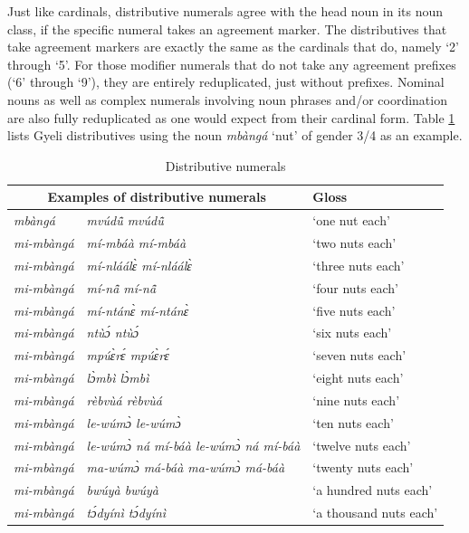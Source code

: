 \noindent Just like cardinals, distributive numerals agree with the head noun in its noun class, if the specific numeral takes an agreement marker. The distributives that take agreement markers are exactly the same as the cardinals that do, namely `2' through `5'. For those modifier numerals that do not take any agreement prefixes (`6' through `9'), they are entirely reduplicated, just without prefixes. Nominal nouns as well as complex numerals involving noun phrases and/or coordination are also fully reduplicated as one would expect from their cardinal form. Table \ref{tab:Distributives} lists Gyeli distributives using the noun {\itshape mbàngá} `nut' of gender 3/4 as an example. 

\begin{table} 
\centering
\begin{tabular}{ll|l}
 \midrule
\multicolumn{2}{c}{Examples of distributive numerals}  & Gloss \\
  \midrule
{\itshape mbàngá} & {\itshape mvúdũ̂ mvúdũ̂} & `one nut each' \\
{\itshape mi-mbàngá} & {\itshape mí-mbáà mí-mbáà} & `two nuts each'\\
{\itshape mi-mbàngá} & {\itshape mí-nláálɛ̀ mí-nláálɛ̀} & `three nuts each' \\
{\itshape mi-mbàngá} & {\itshape mí-nã̂ mí-nã̂} & `four nuts each' \\
{\itshape mi-mbàngá} & {\itshape mí-ntánɛ̀ mí-ntánɛ̀} & `five nuts each' \\
{\itshape mi-mbàngá} & {\itshape ntùɔ́ ntùɔ́} & `six nuts each' \\
{\itshape mi-mbàngá} & {\itshape mpúɛ̀rɛ́ mpúɛ̀rɛ́} & `seven nuts each' \\
{\itshape mi-mbàngá} & {\itshape lɔ̀mbì lɔ̀mbì} & `eight nuts each' \\
{\itshape mi-mbàngá} & {\itshape rèbvùá rèbvùá} & `nine nuts each' \\
{\itshape mi-mbàngá} & {\itshape le-wúmɔ̀ le-wúmɔ̀} & `ten nuts each' \\
{\itshape mi-mbàngá} & {\itshape le-wúmɔ̀ ná mí-báà le-wúmɔ̀ ná mí-báà} & `twelve nuts each' \\
{\itshape mi-mbàngá} & {\itshape ma-wúmɔ̀ má-báà ma-wúmɔ̀ má-báà} & `twenty nuts each' \\
{\itshape mi-mbàngá} & {\itshape bwúyà bwúyà} & `a hundred nuts each' \\
{\itshape mi-mbàngá} & {\itshape tɔ́dyínì tɔ́dyínì} & `a thousand nuts each' \\
  \midrule
\end{tabular}
\caption{Distributive numerals}
\label{tab:Distributives}
\end{table}



